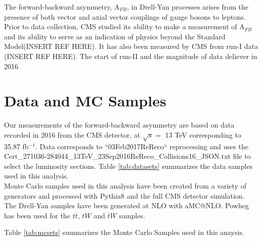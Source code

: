 \documentclass[
10pt, %
a4paper, %
oneside, %
headinclude,footinclude, %
BCOR5mm, %
]{scrartcl}
\begin{document}
The forward-backward asymmetry, A$_{FB}$, in Drell-Yan processes arises from the presence of both vector 
and axial vector couplings of gauge bosons to leptons. Prior to data collection, CMS studied its ability to
make a measurement of A$_{FB}$ and its ability to serve as an indication of physics beyond the Standard 
Model(INSERT REF HERE). It has also been measured by CMS from run-I data (INSERT REF HERE). The start of
run-II and the magnitude of data deliever in 2016 

 

\section{Data and MC Samples}

Our measurements of the forward-backward asymmetry are based on data recorded in 2016 from the CMS detector, at $\sqrt{s} =$ 13 TeV
corresponding to 35.87 fb$^{-1}$. Data corresponds to ``03Feb2017ReReco`` reprocessing and uses the
{\small Cert\_271036-284044\_13TeV\_23Sep2016ReReco\_Collisions16\_JSON.txt} file to select the luminosity sections.
Table \ref{tab:datasets} summarizes the data samples used in this analysis.\\

Monte Carlo samples used in this analysis have been created from a variety of generators and processed with Pythia8 and the full CMS detector simulation.
The Drell-Yan samples have been generated at NLO with aMC@NLO. Powheg has been used for the $t \bar{t}$, $tW$ and $\bar{t}W$ samples. 

Table \ref{tab:mcsets} summarizes the Monte Carlo Samples used in this anaysis.\\
\end{document}
